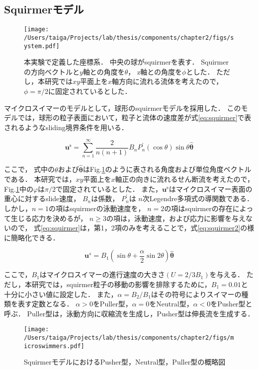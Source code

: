 \subsection{Squirmerモデル}
    \begin{figure}[htbp]
        \centering
        \texttt{[image: /Users/taiga/Projects/lab/thesis/components/chapter2/figs/system.pdf]}
        \caption{本実験で定義した座標系．
        中央の球がsquirmerを表す．
        Squirmerの方向ベクトルと$y$軸との角度を$\theta$，
        z軸との角度を$\phi$とした．
        ただし，本研究では$xy$平面上を$x$軸方向に流れる流体を考えたので，
        $\phi = \pi / 2$に固定されているとした．}
        \label{fig:system}
    \end{figure}

マイクロスイマーのモデルとして，球形のsquirmerモデル\cite{squirmer}を採用した．
このモデルでは，球形の粒子表面において，粒子と流体の速度差が式\eqref{eq:squirmer}で表されるようなsliding境界条件を用いる．

    \begin{equation}
        \boldsymbol{u}^\mathrm{s} = 
            \sum_{n=1}^\infty\frac{2}{n(n + 1)} B_n P_n^\prime(\cos{\theta}) \sin{\theta} \hat{\boldsymbol{\theta}}
        \label{eq:squirmer}
    \end{equation}

\noindent
ここで， 式中の$\theta$および$\boldsymbol{\hat{\theta}}$はFig.\ref{fig:system}のように表される角度および単位角度ベクトルである．
本研究では，$xy$平面上を$x$軸正の向きに流れるせん断流を考えたので，
Fig.\ref{fig:system}中の$\varphi$は$\pi / 2$で固定されているとした．
また，$\boldsymbol{u}^\mathrm{s}$はマイクロスイマー表面の重心に対するslide速度，
$B_n$は係数，
$P^\prime_n$は $n$次Legendre多項式の導関数である．
しかし，$n=1$の項はsquirmerの泳動速度を，
$n=2$の項はsquirmerの存在によって生じる応力を決めるが，
$n \geq 3$の項は，泳動速度，および応力に影響を与えないので，
式\eqref{eq:squirmer}は，第1，2項のみを考えることで，式\eqref{eq:squirmer2}の様に簡略化できる．

    \begin{equation}
        \boldsymbol{u}^s =
            B_1 \left( \sin{\theta} + \frac{\alpha}{2} \sin{2\theta} \right) \hat{\boldsymbol{\theta}}
        \label{eq:squirmer2}
    \end{equation}

\noindent
ここで，$B_1$はマイクロスイマーの進行速度の大きさ$(U = 2/3 B_1)$を与える．
ただし，本研究では，squirmer粒子の移動の影響を排除するために，$B_1 = 0.01$と十分に小さい値に設定した．
また，$\alpha = B_2/B_1$はその符号によりスイマーの種類を表す定数となる．
$\alpha > 0$をPuller型，$\alpha = 0$をNeutral型，$\alpha < 0$をPusher型と呼ぶ．
Puller型は，泳動方向に収縮流を生成し，Pusher型は伸長流を生成する．

    \begin{figure}[H]
        \centering
        \texttt{[image: /Users/taiga/Projects/lab/thesis/components/chapter2/figs/microswimmers.pdf]}
        \caption{SquirmerモデルにおけるPusher型，Neutral型，Puller型の概略図}
        \label{fig:squirmermodel}
    \end{figure}
